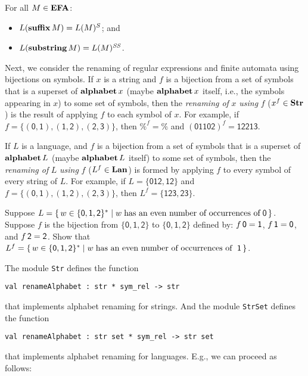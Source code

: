 \begin{theorem}
For all $M\in\mathbf{EFA}$:
\begin{itemize}
\item $L(\mathbf{suffix}\,M) = L(M)^S$; and

\item $L(\mathbf{substring}\,M) = L(M)^{\mathit{SS}}$.
\end{itemize}
\end{theorem}

Next, we consider the renaming of regular expressions and finite
automata using bijections on symbols.  If $x$ is a string and $f$ is a
bijection from a set of symbols that is a superset of $\mathbf{alphabet}\,x$
(maybe $\mathbf{alphabet}\,x$ itself, i.e., the symbols appearing in $x$) to
some set of symbols, then the \emph{renaming of} $x$ \emph{using} $f$
($x^f\in\mathbf{Str}$) is the result of applying $f$ to
%
%
%
%
each symbol of $x$.  For example, if
$f=\mathsf{\{(0, 1), (1, 2), (2, 3)\}}$, then $\%^f=\%$ and
$(\mathsf{01102})^f=\mathsf{12213}$.

If $L$ is a language, and $f$ is a bijection from a set of symbols
that is a superset of $\mathbf{alphabet}\,L$ (maybe $\mathbf{alphabet}\,L$ itself)
to some set of symbols, then the \emph{renaming of} $L$ \emph{using}
%
%
%
%
$f$ ($L^f\in\mathbf{Lan}$) is formed by applying $f$ to every symbol of every string
of $L$.  For example, if $L=\{\mathsf{012, 12}\}$ and
$f=\mathsf{\{(0, 1), (1, 2), (2, 3)\}}$, then $L^f=\{\mathsf{123,
23}\}$.

\begin{exercise}
Suppose
$L = \{ \, w\in\{\mathsf{0,1,2}\}^* \mid w\;\allowbreak\mbox{has an even number
    of occurrences of}\allowbreak\;\mathsf{0} \, \}$. Suppose $f$ is the bijection from
$\{\mathsf{0,1,2}\}$ to $\{\mathsf{0,1,2}\}$ defined by:
$f\,\mathsf{0} = \mathsf{1}$, $f\,\mathsf{1} = \mathsf{0}$, and
$f\,\mathsf{2} = \mathsf{2}$. Show that $L^f = 
\{ \, w\in\{\mathsf{0,1,2}\}^* \mid w\;\allowbreak\mbox{has an even number
    of occurrences of }\allowbreak\;\mathsf{1} \, \}$.
\end{exercise}

The module \texttt{Str}
%
defines the function
\begin{verbatim}
val renameAlphabet : str * sym_rel -> str
\end{verbatim}
that implements alphabet renaming for strings.
And the module \texttt{StrSet}
%
defines the function
\begin{verbatim}
val renameAlphabet : str set * sym_rel -> str set
\end{verbatim}
%
that implements alphabet renaming for languages.
E.g., we can proceed as follows:


